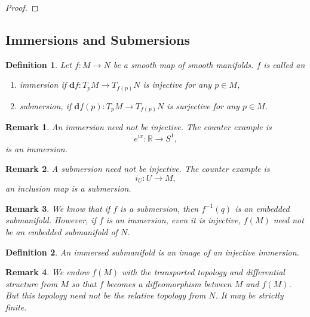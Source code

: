 \documentclass{article}
\newtheorem{definition}{Definition}[section]
\newtheorem{remark}{Remark}[section]
\numberwithin{equation}{section}
\begin{document}
\begin{proof}

\end{proof}

\subsection{Immersions and Submersions}

\begin{definition}
Let $f:M\to N$ be a smooth map of smooth manifolds. $f$ is called an
\begin{enumerate}[1).]
\item immersion if $\mathbf{d}f:T_pM\to T_{f(p)}N$ is injective for any $p\in M$,
\item submersion, if $\mathbf{d}f(p):T_pM\to T_{f(p)}N$ is surjective for any $p\in M$.
\end{enumerate}
\end{definition}

\begin{remark}
An immersion need not be injective. The counter example is 
\begin{equation*}
e^{ix}:\mathbb{R}\to S^1,
\end{equation*}
is an immersion.
\end{remark}

\begin{remark}
A submersion need not be injective. The counter example is 
\begin{equation*}
i_U:U\to M,
\end{equation*}
an inclusion map is a submersion.
\end{remark}

\begin{remark}
We know that if $f$ is a submersion, then $f^{-1}(q)$ is an embedded submanifold. However, if $f$ is an immersion, even it is injective,  $f(M)$ need not be an embedded submanifold of $N$.
\end{remark}

\begin{definition}
An immersed submanifold is an image of an injective immersion. 
\end{definition}

\begin{remark}
We endow $f(M)$ with the transported topology and differential structure from $M$ so that $f$ becomes a diffeomorphism between $M$ and $f(M)$. But this topology need not be the relative topology from $N$. It may be strictly finite.
\end{remark}
\end{document}
